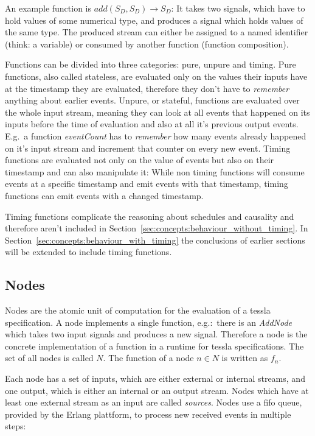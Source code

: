 An example function is \(add(S_D,S_D) \rightarrow S_D\): It takes two signals, which have to hold values of some numerical type, and produces a signal which holds values of the same type.
The produced stream can either be assigned to a named identifier (think: a variable) or consumed by another function (function composition).

Functions can be divided into three categories: pure, unpure and timing.
Pure functions, also called stateless, are evaluated only on the values their inputs have at the timestamp they are evaluated, therefore they don't have to \emph{remember} anything about earlier events.
Unpure, or stateful, functions are evaluated over the whole input stream, meaning they can look at all events that happened on its inputs before the time of evaluation and also at all it's previous output events.
E.g.\ a function \emph{eventCount} has to \emph{remember} how many events already happened on it's input stream and increment that counter on every new event.
Timing functions are evaluated not only on the value of events but also on their timestamp and can also manipulate it:
While non timing functions will consume events at a specific timestamp and emit events with that timestamp, timing functions can emit events with a changed timestamp.

Timing functions complicate the reasoning about schedules and causality and therefore aren't included in Section~\ref{sec:concepts:behaviour_without_timing}.
In Section~\ref{sec:concepts:behaviour_with_timing} the conclusions of earlier sections will be extended to include timing functions.


\subsection{Nodes}
\label{sec:concepts:defs:nodes}

Nodes are the atomic unit of computation for the evaluation of a \gls{tessla} specification.
A node implements a single function, e.g.:\ there is an \emph{AddNode} which takes two input signals and produces a new signal.
Therefore a node is the concrete implementation of a function in a runtime for \gls{tessla} specifications.
The set of all nodes is called \(N\).
The function of a node \(n \in N\) is written as \(f_n\).

Each node has a set of inputs, which are either external or internal streams, and one output, which is either an internal or an output stream.
Nodes which have at least one external stream as an input are called \emph{sources}.
Nodes use a \gls{fifo} queue, provided by the Erlang plattform, to process new received events in multiple steps:

